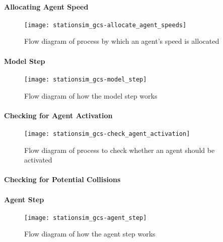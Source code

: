 \paragraph{Allocating Agent Speed}\label{para:submodels:agent_speed}

\begin{figure}[h]
    \centering
    \texttt{[image: stationsim\_gcs-allocate\_agent\_speeds]}
    \caption{Flow diagram of process by which an agent's speed is allocated}
    \label{fig:flow:allocate_agent_speed}
\end{figure}

\paragraph{Model Step}\label{para:submodels:model_step}

\begin{figure}[h]
    \centering
    \texttt{[image: stationsim\_gcs-model\_step]}
    \caption{Flow diagram of how the model step works}
    \label{fig:flow:model_step}
\end{figure}

\paragraph{Checking for Agent Activation}\label{para:submodels:agent_activation}

\begin{figure}[h]
    \centering
    \texttt{[image: stationsim\_gcs-check\_agent\_activation]}
    \caption{Flow diagram of process to check whether an agent should be
    activated}
    \label{fig:flow:check_agent_activation}
\end{figure}

\paragraph{Checking for Potential Collisions}\label{para:submodels:collisions}

\paragraph{Agent Step}\label{para:submodels:agent_step}

\begin{figure}[h]
    \centering
    \texttt{[image: stationsim\_gcs-agent\_step]}
    \caption{Flow diagram of how the agent step works}
    \label{fig:flow:agent_step}
\end{figure}

